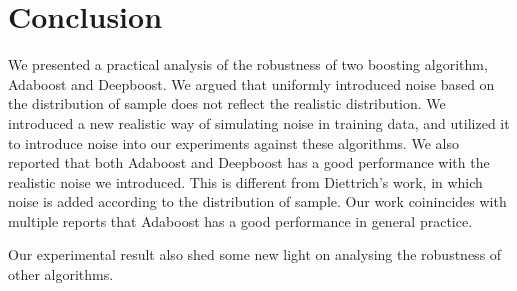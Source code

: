 \section{Conclusion}
We presented a practical analysis of the robustness of two boosting algorithm, Adaboost and Deepboost.
We argued that uniformly introduced noise based on the distribution of sample does not reflect the realistic distribution.
We introduced a new realistic way of simulating noise in training data, and utilized it to introduce
noise into our experiments against these algorithms.
We also reported that both Adaboost and Deepboost has a good performance with the realistic noise we introduced.
This is different from Diettrich's work\cite{dietterich2000experimental}, in which noise is added according to the distribution of sample.
Our work coinincides with multiple reports that Adaboost has a good performance in general practice.

Our experimental result also shed some new light on analysing the robustness of other algorithms.
